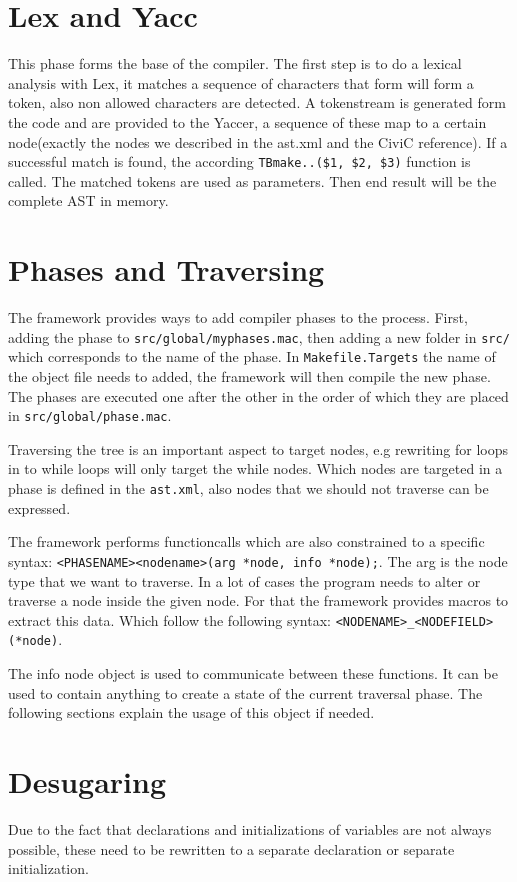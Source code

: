 \documentclass[a4paper]{article}
\begin{document}
\section{Lex and Yacc}
This phase forms the base of the compiler. The first step is to do a lexical
analysis with Lex, it matches a sequence of characters that form will form a
token, also non allowed characters are detected. A tokenstream is generated
form the code and are provided to the Yaccer, a sequence of these map to a
certain node(exactly the nodes we described in the ast.xml and the CiviC
reference). If a successful match is found, the according \texttt{TBmake..(\$1, \$2, \$3)} function is called. The
matched tokens are used as parameters. Then end result will be the complete AST
in memory.

\section{Phases and Traversing}
The framework provides ways to add compiler phases to the process. First,
adding the phase to \texttt{src/global/myphases.mac}, then adding a new folder
in \texttt{src/} which corresponds to the name of the phase. In
\texttt{Makefile.Targets} the name of the object file needs to added, the
framework will then compile the new phase. The phases are executed one after
the other in the order of which they are placed in \texttt{src/global/phase.mac}.

Traversing the tree is an important aspect to target nodes, e.g rewriting for
loops in to while loops will only target the while nodes. Which nodes are
targeted in a phase is defined in the \texttt{ast.xml}, also nodes that we
should not traverse can be expressed.

The framework performs functioncalls which are also constrained to a specific
syntax: \texttt{<PHASENAME><nodename>(arg *node, info *node);}. The arg is the
node type that we want to traverse. In a lot of cases the program needs to
alter or traverse a node inside the given node. For that the framework provides
macros to extract this data. Which follow the following syntax:
\texttt{<NODENAME>\_<NODEFIELD>(*node)}.

The info node object is used to communicate between these functions. It can be
used to contain anything to create a state of the current traversal phase. The
following sections explain the usage of this object if needed.

\section{Desugaring}
Due to the fact that declarations and initializations of variables are not
always possible, these need to be rewritten to a separate declaration or separate
initialization.
\end{document}
